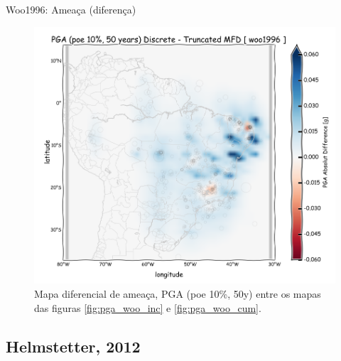 \documentclass[ucs,8pt]{beamer}
\begin{document}
\begin{frame}{Woo1996: Ameaça (diferença)}
\begin{figure}[H]
	\centering
		\includegraphics[height=0.95\textheight]{pga_woo_dif} 
		\caption{Mapa diferencial de ameaça, PGA (poe 10\%, 50y)
		   entre os mapas das figuras 
		   \ref{fig:pga_woo_inc} e \ref{fig:pga_woo_cum}.}
		\label{fig:pga_woo_dif} 
\end{figure}
\end{frame}



\subsection{Helmstetter, 2012}
\end{document}

